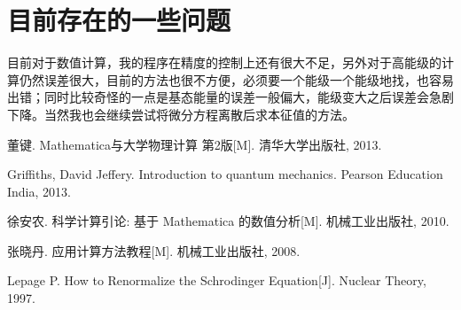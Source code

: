 \documentclass{ctexart}
\begin{document}
\section{目前存在的一些问题}
目前对于数值计算，我的程序在精度的控制上还有很大不足，另外对于高能级的计算仍然误差很大，目前的方法也很不方便，必须要一个能级一个能级地找，也容易出错；同时比较奇怪的一点是基态能量的误差一般偏大，能级变大之后误差会急剧下降。当然我也会继续尝试将微分方程离散后求本征值的方法。
\begin{thebibliography}{1}

董键. Mathematica与大学物理计算 第2版[M]. 清华大学出版社, 2013.

Griffiths, David Jeffery. Introduction to quantum mechanics. Pearson Education India, 2013.

徐安农. 科学计算引论: 基于 Mathematica 的数值分析[M]. 机械工业出版社, 2010.

张晓丹. 应用计算方法教程[M]. 机械工业出版社, 2008.

Lepage P. How to Renormalize the Schrodinger Equation[J]. Nuclear Theory, 1997.

\end{thebibliography}
\end{document}
